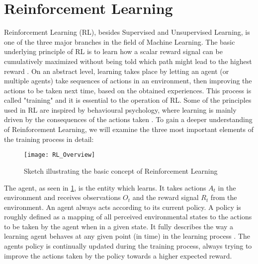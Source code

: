 

\section{Reinforcement Learning} \label{sec: Reinforcement Learning}

Reinforcement Learning (RL), besides Supervised and Unsupervised Learning, is one of the three major branches in the field of Machine Learning.
The basic underlying principle of RL is to learn how a scalar reward signal can be cumulatively maximized without being told which path might lead to the highest reward \parencite{sutton2018reinforcement}.
On an abstract level, learning takes place by letting an agent (or multiple agents) take sequences of actions in an environment, then improving the actions to be taken next time, based on the obtained experiences.
This process is called "training" and it is essential to the operation of RL.
Some of the principles used in RL are inspired by behavioural psychology, where learning is mainly driven by the consequences of the actions taken \parencite{sutton2018reinforcement, joshi2021reinforcement}.
To gain a deeper understanding of Reinforcement Learning, we will examine the three most important elements of the training process in detail:

\begin{figure}[h]
	\centerline{\texttt{[image: RL\_Overview]}}
	\caption{Sketch illustrating the basic concept of Reinforcement Learning}
	\label{figure: RL Illustration}
\end{figure}

The agent, as seen in \ref{figure: RL Illustration}, is the entity which learns. It takes actions $A_t$ in the environment and receives observations $O_t$ and the reward signal $R_t$ from the environment.
An agent always acts according to its current policy.
A policy is roughly defined as a mapping of all perceived environmental states to the actions to be taken by the agent when in a given state.
It fully  describes the way a learning agent behaves at any given point (in time) in the learning process \parencite{sutton2018reinforcement, silver2015}.
The agents policy is continually updated during the training process, always trying to improve the actions taken by the policy towards a higher expected reward.

